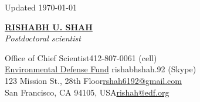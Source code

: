 \documentclass{article}
\begin{document}
\begin{flushright}
Updated \today
\end{flushright}
\begin{center}
\href{https://www.linkedin.com/pub/rishabh-shah/46/962/361}{\Large \textbf{RISHABH U. SHAH}}\\\textit{Postdoctoral scientist}
\end{center}
\vspace{-2.5mm}
Office of Chief Scientist\hfill 412-807-0061 (cell)\\\href{https://www.edf.org/}{Environmental Defense Fund}
\hfill rishabhshah.92 (Skype)\\123 Mission St., 28th Floor\hfill \href{mailto:rshah6192@gmail.com}{rshah6192@gmail.com}\\San Francisco, CA 94105, USA\hfill \href{mailto:rishah@edf.org}{rishah@edf.org}
\newline
\vspace{5mm}
\end{document}
